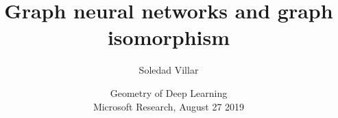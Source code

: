 \documentclass{beamer}
\begin{document}
\title{Graph neural networks and graph isomorphism}
\author{Soledad Villar}

\date{Geometry of Deep Learning \\ Microsoft Research, August 27 2019 }
\begin{frame}
\maketitle
\end{frame}



%
%
%
\end{document}
